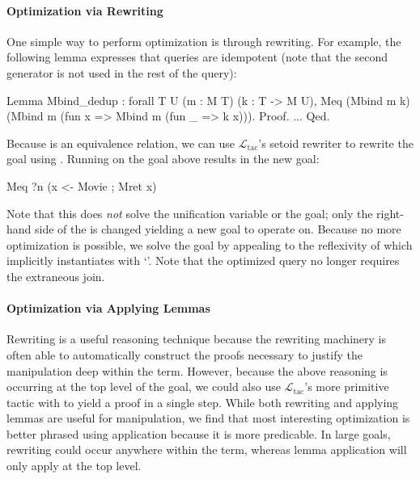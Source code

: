 \documentclass{sigplanconf}
\newcommand{\ltac}[0]{\ensuremath{\mathcal{L}_{\mathrm{tac}}}}
\begin{document}
\paragraph{Optimization via Rewriting}
One simple way to perform optimization is through rewriting.
For example, the following lemma expresses that queries are idempotent (note that the second generator is not used in the rest of the query):
\begin{coq}
Lemma Mbind_dedup : forall {T U} (m : M T) (k : T -> M U),
  Meq (Mbind m k) (Mbind m (fun x => Mbind m (fun _ => k x))).
Proof. ... Qed.
\end{coq}
Because  is an equivalence relation, we can use \ltac's setoid rewriter to rewrite the goal using .
Running  on the goal above results in the new goal:
\begin{coq}
Meq ?n (x <- Movie ; Mret x)
\end{coq}
Note that this does \emph{not} solve the unification variable  or the goal; only the right-hand side of the  is changed yielding a new goal to operate on.
Because no more optimization is possible, we solve the goal by appealing to the reflexivity of  which implicitly instantiates  with `'.
Note that the optimized query no longer requires the extraneous join.

\paragraph{Optimization via Applying Lemmas}
Rewriting is a useful reasoning technique because the rewriting machinery is often able to automatically construct the proofs necessary to justify the manipulation deep within the term.
However, because the above reasoning is occurring at the top level of the goal, we could also use \ltac's more primitive  tactic with  to yield a proof in a single step.
While both rewriting and applying lemmas are useful for manipulation, we find that most interesting optimization is better phrased using application because it is more predicable.
In large goals, rewriting could occur anywhere within the term, whereas lemma application will only apply at the top level.
\end{document}
